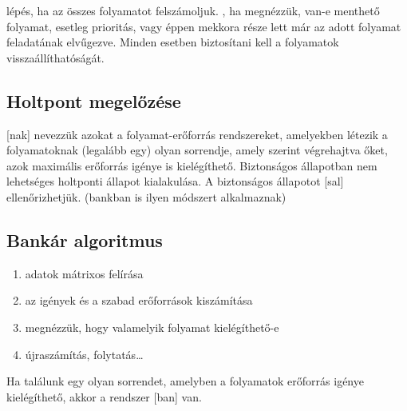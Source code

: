 \documentclass[../main.tex]{subfiles}
\begin{document}
 lépés, ha az összes folyamatot felszámoljuk.
, ha megnézzük, van-e menthető folyamat, esetleg
prioritás, vagy éppen mekkora része lett már az adott
folyamat feladatának elvűgezve. Minden esetben biztosítani
kell a folyamatok visszaállíthatóságát.

\subsection{Holtpont megelőzése}

[nak] nevezzük azokat a folyamat-erőforrás rendszereket,
amelyekben létezik a folyamatoknak (legalább egy) olyan sorrendje,
amely szerint végrehajtva őket, azok maximális erőforrás igénye is kielégíthető.
Biztonságos állapotban nem lehetséges holtponti állapot kialakulása.
A biztonságos állapotot [sal] ellenőrizhetjük.
(bankban is ilyen módszert alkalmaznak)

\subsection{Bankár algoritmus}

\begin{enumerate}
	\item adatok mátrixos felírása
	\item az igények és a szabad erőforrások kiszámítása
	\item megnézzük, hogy valamelyik folyamat kielégíthető-e
	\item újraszámítás, folytatás\dots
\end{enumerate}
Ha találunk egy olyan sorrendet,
amelyben a folyamatok erőforrás igénye kielégíthető,
akkor a rendszer [ban] van.
\end{document}
